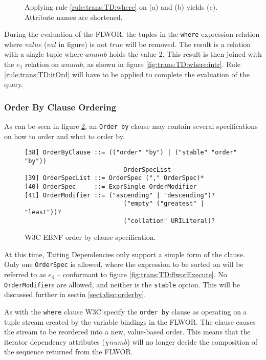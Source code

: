 \begin{myExample}
\begin{figure}[h]
\caption[Example: Evaluation of where clause]{Applying rule \ref{rule:trans:TD:where} on (a) and (b)
yields (c). Attribute names are shortened. \label{fig:trans:TD:whereClause}}
\end{figure}

During the evaluation of the FLWOR, the tuples in the \texttt{where} expression relation where $value$ ($val$ in
figure) is not $true$ will be removed. The result is a relation with a single tuple where $anumb$ holds the value
$2$. This result is then joined with the $e_1$ relation on $anumb$, as shown in figure
\ref{fig:trans:TD:where:intr}. Rule \ref{rule:trans:TD:itOrd} will have to be applied to complete the
evaluation of the query.
\end{myExample}


\subsubsection{Order By Clause Ordering}

As can be seen in figure \ref{fig:trans:TD:ordEBNF}, an \texttt{Order by} clause may contain several specifications on
how to order and what to order by.
\begin{figure}[h]
\begin{Verbatim}
[38] OrderByClause ::= (("order" "by") | ("stable" "order" "by")) 
                           OrderSpecList
[39] OrderSpecList ::= OrderSpec ("," OrderSpec)*
[40] OrderSpec     ::= ExprSingle OrderModifier
[41] OrderModifier ::= ("ascending" | "descending")? 
                           ("empty" ("greatest" | "least"))? 
                           ("collation" URILiteral)?
\end{Verbatim}
\label{fig:trans:TD:ordEBNF}
\caption[W3C EBNF order by clause specification]{W3C EBNF order by clause specification.}
\end{figure}

At this time, Taiting Dependencies only support a simple form of the clause. Only one \texttt{OrderSpec} is
allowed, where the expression to be sorted on will be referred to as $e_4$ -- conformant to figure
\ref{fig:trans:TD:flworExecute}. No \texttt{OrderModifier}s are allowed, and neither is the \texttt{stable}
option. This will be discussed further in sectin \ref{sect:disc:orderby}.

As with the \texttt{where} clause W3C specify the \texttt{order by} clause as operating on a tuple stream created
by the variable bindings in the FLWOR. The clause causes the stream to be reordered into a new, value-based order.
This means that the iterator dependency attributes ($\chi{numb}$) will no longer decide the composition of the
sequence returned from the FLWOR.

